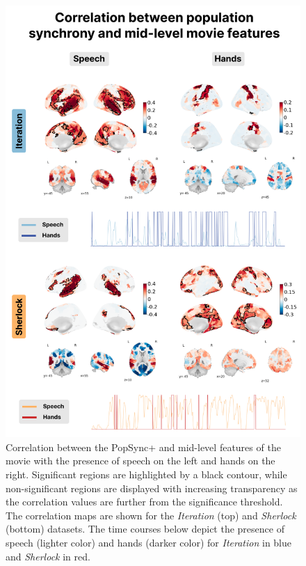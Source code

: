 \begin{figure}[!ht]
\centering
\includegraphics[width=0.7\linewidth]{figures/multi_subject/mid_order_speech_hands.png}
\caption[]{Correlation between the PopSync+ and mid-level features of the movie
with the presence of speech on the left and hands on the right. Significant
regions are highlighted by a black contour, while non-significant regions are
displayed with increasing transparency as the correlation values are further
from the significance threshold. The correlation maps are shown for the
\textit{Iteration} (top) and \textit{Sherlock} (bottom) datasets. The time
courses below depict the presence of speech (lighter color) and hands (darker
color) for \textit{Iteration} in blue and \textit{Sherlock} in red.}
\label{fig:mid_order_speech_hands}
\end{figure}

